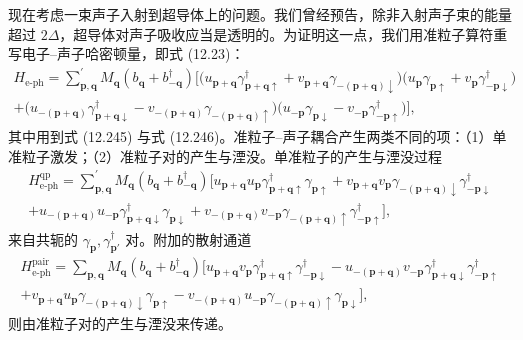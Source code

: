 现在考虑一束声子入射到超导体上的问题。我们曾经预告，除非入射声子束的能量超过 $2\Delta$，超导体对声子吸收应当是透明的。为证明这一点，我们用准粒子算符重写电子–声子哈密顿量，即式 (12.23)：
\begin{align*}
H_{\mathrm{e}\text{-}\mathrm{ph}}=\sum_{\mathbf{p},\mathbf{q}}^{\prime}M_{\mathbf{q}}\left(b_{\mathbf{q}}+b_{-\mathbf{q}}^{\dagger}\right)\Big[\big(u_{\mathbf{p}+\mathbf{q}}\gamma_{\mathbf{p}+\mathbf{q}\uparrow}^{\dagger}+v_{\mathbf{p}+\mathbf{q}}\gamma_{-(\mathbf{p}+\mathbf{q})\downarrow}\big)\big(u_{\mathbf{p}}\gamma_{\mathbf{p}\uparrow}+v_{\mathbf{p}}\gamma_{-\mathbf{p}\downarrow}^{\dagger}\big)\\
+\big(u_{-(\mathbf{p}+\mathbf{q})}\gamma_{\mathbf{p}+\mathbf{q}\downarrow}^{\dagger}-v_{-(\mathbf{p}+\mathbf{q})}\gamma_{-(\mathbf{p}+\mathbf{q})\uparrow}\big)\big(u_{-\mathbf{p}}\gamma_{\mathbf{p}\downarrow}-v_{-\mathbf{p}}\gamma_{-\mathbf{p}\uparrow}^{\dagger}\big)\Big],\tag{12.281}
\end{align*}
其中用到式 (12.245) 与式 (12.246)。准粒子–声子耦合产生两类不同的项：（1）单准粒子激发；（2）准粒子对的产生与湮没。单准粒子的产生与湮没过程
\begin{align*}
H_{\mathrm{e}\text{-}\mathrm{ph}}^{\mathrm{qp}}=\sum_{\mathbf{p},\mathbf{q}}^{\prime}M_{\mathbf{q}}\left(b_{\mathbf{q}}+b_{-\mathbf{q}}^{\dagger}\right)\Big[u_{\mathbf{p}+\mathbf{q}}u_{\mathbf{p}}\gamma_{\mathbf{p}+\mathbf{q}\uparrow}^{\dagger}\gamma_{\mathbf{p}\uparrow}+v_{\mathbf{p}+\mathbf{q}}v_{\mathbf{p}}\gamma_{-(\mathbf{p}+\mathbf{q})\downarrow}\gamma_{-\mathbf{p}\downarrow}^{\dagger}\\
+u_{-(\mathbf{p}+\mathbf{q})}u_{-\mathbf{p}}\gamma_{\mathbf{p}+\mathbf{q}\downarrow}^{\dagger}\gamma_{\mathbf{p}\downarrow}+v_{-(\mathbf{p}+\mathbf{q})}v_{-\mathbf{p}}\gamma_{-(\mathbf{p}+\mathbf{q})\uparrow}\gamma_{-\mathbf{p}\uparrow}^{\dagger}\Big],\tag{12.282}
\end{align*}
来自共轭的 $\gamma_{\mathbf{p}},\gamma_{\mathbf{p}'}^{\dagger}$ 对。附加的散射通道
\begin{align*}
H_{\mathrm{e}\text{-}\mathrm{ph}}^{\mathrm{pair}}=\sum_{\mathbf{p},\mathbf{q}}M_{\mathbf{q}}\left(b_{\mathbf{q}}+b_{-\mathbf{q}}^{\dagger}\right)\big[u_{\mathbf{p}+\mathbf{q}}v_{\mathbf{p}}\gamma_{\mathbf{p}+\mathbf{q}\uparrow}^{\dagger}\gamma_{-\mathbf{p}\downarrow}^{\dagger}-u_{-(\mathbf{p}+\mathbf{q})}v_{-\mathbf{p}}\gamma_{\mathbf{p}+\mathbf{q}\downarrow}^{\dagger}\gamma_{-\mathbf{p}\uparrow}^{\dagger}\\
+v_{\mathbf{p}+\mathbf{q}}u_{\mathbf{p}}\gamma_{-(\mathbf{p}+\mathbf{q})\downarrow}\gamma_{\mathbf{p}\uparrow}-v_{-(\mathbf{p}+\mathbf{q})}u_{-\mathbf{p}}\gamma_{-(\mathbf{p}+\mathbf{q})\uparrow}\gamma_{\mathbf{p}\downarrow}\big],\tag{12.283}
\end{align*}
则由准粒子对的产生与湮没来传递。

